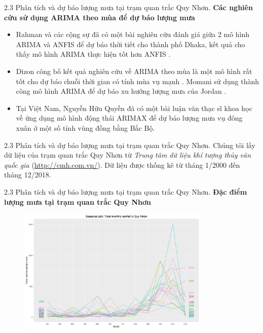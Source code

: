 \documentclass[notheorems,envcountsect,hyperref=unicode]{beamer}
\begin{document}
\begin{frame}{2.3 Phân tích và dự báo lượng mưa tại trạm quan trắc Quy Nhơn.}
	\textbf{Các nghiên cứu sử dụng ARIMA theo mùa để dự báo lượng mưa}\\
	\begin{itemize}
		\item Rahman và các cộng sự đã có một bài nghiên cứu đánh giá giữa 2 mô hình ARIMA và ANFIS để dự báo thời tiết cho thành phố Dhaka, kết quả cho thấy mô hình ARIMA thực hiện tốt hơn ANFIS \cite{18}.
		\item Dizon công bố kết quả nghiên cứu về ARIMA theo mùa là một mô hình rất tốt cho dự báo chuỗi thời gian có tính mùa vụ mạnh \cite{19}. Momani sử dụng thành công mô hình ARIMA để dự báo xu hướng lượng mưa của Jordan \cite{20}.
		\item Tại Việt Nam, Nguyễn Hữu Quyền đã có một bài luận văn thạc sĩ khoa học về ứng dụng mô hình động thái ARIMAX để dự báo lượng mưa vụ đông xuân ở một số tỉnh vùng đồng bằng Bắc Bộ.
	\end{itemize}
\end{frame}

\begin{frame}{2.3 Phân tích và dự báo lượng mưa tại trạm quan trắc Quy Nhơn.}
Chúng tôi lấy dữ liệu của trạm quan trắc Quy Nhơn từ \textit{Trung tâm dữ liệu khí tượng thủy văn quốc gia} (\url{http://cmh.com.vn/}). Dữ liệu được thống kê từ tháng 1/2000 đến tháng 12/2018.
\end{frame}

\begin{frame}{2.3 Phân tích và dự báo lượng mưa tại trạm quan trắc Quy Nhơn.}
\textbf{Đặc điểm lượng mưa tại trạm quan trắc Quy Nhơn}
\begin{figure}[!htb]
	\centering
	\includegraphics[width=1\linewidth,height=6cm]{V2} 
\end{figure}
\end{frame}
\end{document}
